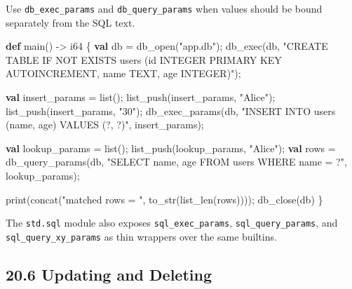 \documentclass[
  english,
]{book}
\newenvironment{Shaded}{\begin{snugshade}}{\end{snugshade}}
\newcommand{\DataTypeTok}[1]{\textcolor[rgb]{0.31,0.79,0.69}{#1}}
\newcommand{\FunctionTok}[1]{\textcolor[rgb]{0.86,0.86,0.67}{#1}}
\newcommand{\KeywordTok}[1]{\textcolor[rgb]{0.34,0.61,0.84}{\textbf{#1}}}
\newcommand{\NormalTok}[1]{\textcolor[rgb]{0.83,0.83,0.83}{#1}}
\newcommand{\OperatorTok}[1]{\textcolor[rgb]{0.83,0.83,0.83}{#1}}
\newcommand{\StringTok}[1]{\textcolor[rgb]{0.81,0.57,0.47}{#1}}
\begin{document}
Use \texttt{db\_exec\_params} and \texttt{db\_query\_params} when values
should be bound separately from the SQL text.

\begin{Shaded}
\begin{Highlighting}[]
\KeywordTok{def}\NormalTok{ main() }\OperatorTok{{-}\textgreater{}} \DataTypeTok{i64}\NormalTok{ \{}
    \KeywordTok{val}\NormalTok{ db }\OperatorTok{=}\NormalTok{ db\_open(}\StringTok{"app.db"}\NormalTok{);}
\NormalTok{    db\_exec(db, }\StringTok{"CREATE TABLE IF NOT EXISTS users (id INTEGER PRIMARY KEY AUTOINCREMENT, name TEXT, age INTEGER)"}\NormalTok{);}

    \KeywordTok{val}\NormalTok{ insert\_params }\OperatorTok{=} \DataTypeTok{list}\NormalTok{();}
\NormalTok{    list\_push(insert\_params, }\StringTok{"Alice"}\NormalTok{);}
\NormalTok{    list\_push(insert\_params, }\StringTok{"30"}\NormalTok{);}
\NormalTok{    db\_exec\_params(db, }\StringTok{"INSERT INTO users (name, age) VALUES (?, ?)"}\NormalTok{, insert\_params);}

    \KeywordTok{val}\NormalTok{ lookup\_params }\OperatorTok{=} \DataTypeTok{list}\NormalTok{();}
\NormalTok{    list\_push(lookup\_params, }\StringTok{"Alice"}\NormalTok{);}
    \KeywordTok{val}\NormalTok{ rows }\OperatorTok{=}\NormalTok{ db\_query\_params(db, }\StringTok{"SELECT name, age FROM users WHERE name = ?"}\NormalTok{, lookup\_params);}

    \FunctionTok{print}\NormalTok{(}\FunctionTok{concat}\NormalTok{(}\StringTok{"matched rows = "}\NormalTok{, }\FunctionTok{to\_str}\NormalTok{(}\FunctionTok{list\_len}\NormalTok{(rows))));}
\NormalTok{    db\_close(db)}
\NormalTok{\}}
\end{Highlighting}
\end{Shaded}

The \texttt{std.sql} module also exposes \texttt{sql\_exec\_params},
\texttt{sql\_query\_params}, and \texttt{sql\_query\_xy\_params} as thin
wrappers over the same builtins.

\subsection{20.6 Updating and Deleting}\label{updating-and-deleting}
\end{document}
